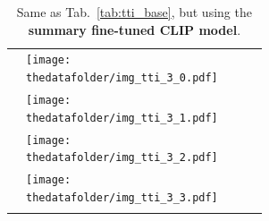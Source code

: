 \documentclass[10pt]{article} %
\begin{document}
\begin{table}[h!]
\begin{tabular}{m{2.7cm} p{2.9cm} p{2.9cm} p{2.9cm} p{2.9cm}}
      \midrule
      \texttt{} \vspace{20mm} & \centering \texttt{[image: \\thedatafolder/img\_tti\_3\_0.pdf]} \\  & \centering \texttt{[image: \\thedatafolder/img\_tti\_3\_1.pdf]} \\  & \centering \texttt{[image: \\thedatafolder/img\_tti\_3\_2.pdf]} \\  & \centering \texttt{[image: \\thedatafolder/img\_tti\_3\_3.pdf]} \\   \tabularnewline
      \bottomrule
  \end{tabular}
  \caption{Same as Tab.~\ref{tab:tti_base}, but using the \textbf{\textcolor{deepred}{summary fine-tuned CLIP model}}.}
  \label{tab:tti}
\end{table}
\end{document}
